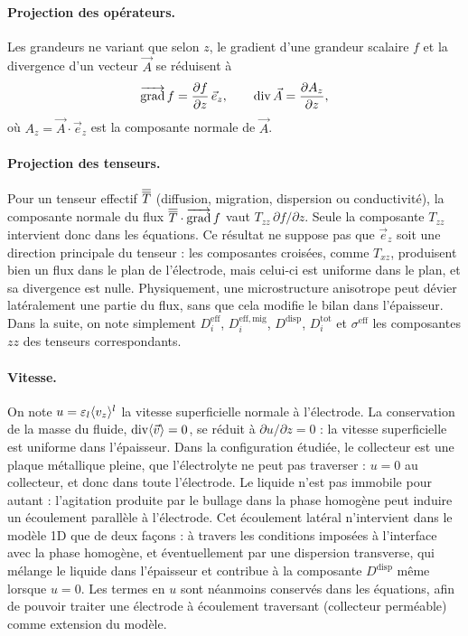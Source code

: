 \paragraph{Projection des opérateurs.} Les grandeurs ne variant que selon $z$,
le gradient d'une grandeur scalaire $f$ et la divergence d'un vecteur
$\vec{A}$ se réduisent à
\begin{equation}
\mathop{\overrightarrow{\operatorname{grad}}}\nolimits f = \frac{\partial f}{\partial z}\,\vec{e}_z ,
\qquad
\operatorname{div}\vec{A} = \frac{\partial A_z}{\partial z} ,
\end{equation}
où $A_z = \vec{A}\cdot\vec{e}_z$ est la composante normale de $\vec{A}$.

\paragraph{Projection des tenseurs.} Pour un tenseur effectif $\overline{\overline{T}}$
(diffusion, migration, dispersion ou conductivité), la composante normale du
flux $\overline{\overline{T}}\cdot\mathop{\overrightarrow{\operatorname{grad}}}\nolimits f$ vaut $T_{zz}\,\partial f/\partial z$. Seule la
composante $T_{zz}$ intervient donc dans les équations. Ce résultat ne
suppose pas que $\vec{e}_z$ soit une direction principale du tenseur : les
composantes croisées, comme $T_{xz}$, produisent bien un flux dans le plan de
l'électrode, mais celui-ci est uniforme dans le plan, et sa divergence est
nulle. Physiquement, une microstructure anisotrope peut dévier latéralement
une partie du flux, sans que cela modifie le bilan dans l'épaisseur. Dans la
suite, on note simplement $D_i^{\mathrm{eff}}$, $D_i^{\mathrm{eff,mig}}$,
$D^{\mathrm{disp}}$, $D_i^{\mathrm{tot}}$ et $\sigma^{\mathrm{eff}}$ les
composantes $zz$ des tenseurs correspondants.

\paragraph{Vitesse.} On note $u = \varepsilon_l\langle v_z \rangle^l$ la vitesse
superficielle normale à l'électrode. La conservation de la masse du fluide,
$\operatorname{div}\langle \vec{v} \rangle = 0$, se réduit à $\partial u/\partial z = 0$ : la vitesse
superficielle est uniforme dans l'épaisseur. Dans la configuration étudiée,
le collecteur est une plaque métallique pleine, que l'électrolyte ne peut pas
traverser : $u = 0$ au collecteur, et donc dans toute l'électrode. Le liquide
n'est pas immobile pour autant : l'agitation produite par le bullage dans la
phase homogène peut induire un écoulement parallèle à l'électrode. Cet
écoulement latéral n'intervient dans le modèle 1D que de deux façons : à
travers les conditions imposées à l'interface avec la phase homogène, et
éventuellement par une dispersion transverse, qui mélange le liquide dans
l'épaisseur et contribue à la composante $D^{\mathrm{disp}}$ même lorsque
$u = 0$. Les termes en $u$ sont néanmoins conservés dans les équations, afin
de pouvoir traiter une électrode à écoulement traversant (collecteur
perméable) comme extension du modèle.

